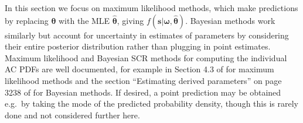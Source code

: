 \documentclass[useAMS,usenatbib,referee]{biom}
\begin{document}

In this section we focus on maximum likelihood methods, which make predictions by replacing $\bm{\theta}$ with the MLE $\hat{\bm{\theta}}$, giving $f(\bm{s}|\bm{\omega},\hat{\bm{\theta}})$. Bayesian methods work similarly but account for uncertainty in estimates of parameters by considering their entire posterior distribution rather than plugging in point estimates. Maximum likelihood and Bayesian SCR methods for computing the individual AC PDFs are well documented, for example in Section 4.3 of \cite{Borchers+Efford:08} for maximum likelihood methods and the section ``Estimating derived parameters'' on page 3238 of \cite{Royle+al:09b} for Bayesian methods. If desired, a point prediction may be obtained e.g.\ by taking the mode of the predicted probability density, though this is rarely done and not considered further here.
\end{document}
